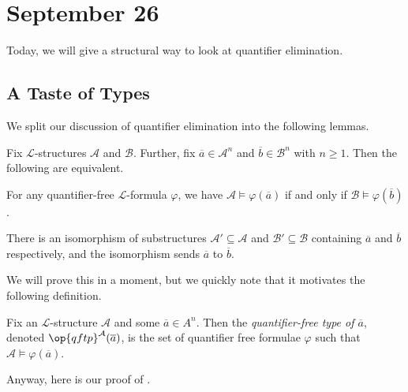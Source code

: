 \documentclass[../notes.tex]{subfiles}
\begin{document}
\section{September 26}

Today, we will give a structural way to look at quantifier elimination.

\subsection{A Taste of Types}
We split our discussion of quantifier elimination into the following lemmas.
\begin{lemma} \label{lem:how-to-qf-type}
	Fix $\mathcal L$-structures $\mathcal A$ and $\mathcal B$. Further, fix $\overline a\in\mathcal A^n$ and $\overline b\in\mathcal B^n$ with $n\ge1$. Then the following are equivalent.
	\begin{listalph}
		\item For any quantifier-free $\mathcal L$-formula $\varphi$, we have $\mathcal A\models\varphi(\overline a)$ if and only if $\mathcal B\models\varphi(\overline b)$.
		\item There is an isomorphism of substructures $\mathcal A'\subseteq\mathcal A$ and $\mathcal B'\subseteq\mathcal B$ containing $\overline a$ and $\overline b$ respectively, and the isomorphism sends $\overline a$ to $\overline b$.
	\end{listalph}
\end{lemma}
We will prove this in a moment, but we quickly note that it motivates the following definition.
\begin{definition}
	Fix an $\mathcal L$-structure $\mathcal A$ and some $\overline a\in A^n$. Then the \textit{quantifier-free type of $\overline a$}, denoted $\op{qftp}^\mathcal A(\overline a)$, is the set of quantifier free formulae $\varphi$ such that $\mathcal A\models\varphi(\overline a)$.
\end{definition}
Anyway, here is our proof of .
\end{document}
